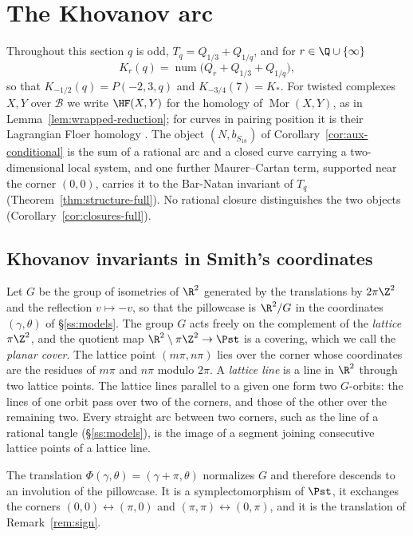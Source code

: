 \section{The Khovanov arc}\label{sec:khovanov}

Throughout this section $q$ is odd, $T_q=Q_{1/3}+Q_{1/q}$, and for $r\in\Q\cup\{\infty\}$
\[
 K_r(q)=\operatorname{num}\bigl(Q_r+Q_{1/3}+Q_{1/q}\bigr),
\]
so that $K_{-1/2}(q)=P(-2,3,q)$ and $K_{-3/4}(7)=K_*$.  For twisted complexes $X,Y$ over $\mathcal B$
we write $\HF(X,Y)$ for the homology of $\operatorname{Mor}(X,Y)$, as in
Lemma~\ref{lem:wrapped-reduction}; for curves in pairing position it is their Lagrangian Floer
homology \cite[Thm.~5.22]{KWZ}.  The object $(N,b_{S_{18}})$ of Corollary~\ref{cor:aux-conditional}
is the sum of a rational arc and a closed curve carrying a two-dimensional local system, and one
further Maurer--Cartan term, supported near the corner $(0,0)$, carries it to the Bar-Natan invariant
of $T_q$ (Theorem~\ref{thm:structure-full}).  No rational closure distinguishes the two objects
(Corollary~\ref{cor:closures-full}).

\subsection{Khovanov invariants in Smith's coordinates}\label{ss:kh-smith}
Let $G$ be the group of isometries of $\R^2$ generated by the translations by $2\pi\Z^2$ and the
reflection $v\mapsto-v$, so that the pillowcase is $\R^2/G$ in the coordinates $(\gamma,\theta)$ of
\S\ref{ss:models}.  The group $G$ acts freely on the complement of the \emph{lattice} $\pi\Z^2$, and
the quotient map $\R^2\setminus\pi\Z^2\to\Pst$ is a covering, which we call the \emph{planar cover}.
The lattice point $(m\pi,n\pi)$ lies over the corner whose coordinates are the residues of $m\pi$
and $n\pi$ modulo $2\pi$.  A \emph{lattice line} is a line in $\R^2$ through two lattice points.  The
lattice lines parallel to a given one form two $G$-orbits: the lines of one orbit pass over two of
the corners, and those of the other over the remaining two.  Every straight arc between two corners,
such as the line of a rational tangle (\S\ref{ss:models}), is the image of a segment joining
consecutive lattice points of a lattice line.

The translation $\Phi(\gamma,\theta)=(\gamma+\pi,\theta)$ normalizes $G$ and therefore descends to an
involution of the pillowcase.  It is a symplectomorphism of $\Pst$, it exchanges the corners
$(0,0)\leftrightarrow(\pi,0)$ and $(\pi,\pi)\leftrightarrow(0,\pi)$, and it is the translation of
Remark~\ref{rem:sign}.

